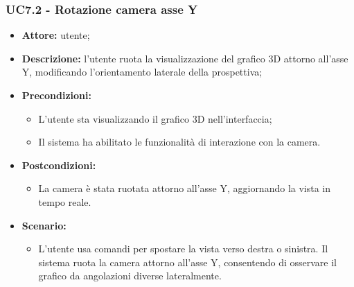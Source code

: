 \subsubsection{UC7.2 - Rotazione camera asse Y}
\begin{itemize}
    \item \textbf{Attore:} utente;
    \item \textbf{Descrizione:} l'utente ruota la visualizzazione del grafico 3D attorno all'asse Y, modificando l'orientamento laterale della prospettiva;
    \item \textbf{Precondizioni:} 
    \begin{itemize}
        \item L'utente sta visualizzando il grafico 3D nell'interfaccia;
        \item Il sistema ha abilitato le funzionalità di interazione con la camera.
    \end{itemize}
    \item \textbf{Postcondizioni:} 
    \begin{itemize}
        \item La camera è stata ruotata attorno all'asse Y, aggiornando la vista in tempo reale.
    \end{itemize}
    \item \textbf{Scenario:} 
    \begin{itemize}
        \item L'utente usa comandi per spostare la vista verso destra o sinistra. Il sistema ruota la camera attorno all'asse Y, consentendo di osservare il grafico da angolazioni diverse lateralmente.
    \end{itemize}
\end{itemize}

